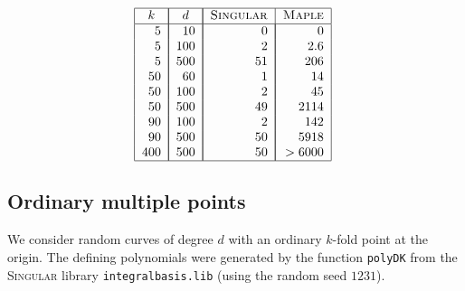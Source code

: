 \documentclass[a4paper,11pt]{amsart}%
\theoremstyle{definition}
\theoremstyle{plain}
\theoremstyle{remark}
\begin{document}
\[%
\begin{tabular}
[c]{|c|c|l|l|}\hline
$k$ & \multicolumn{1}{|c|}{$d$} & \multicolumn{1}{|l|}{\textsc{Singular}} &
\textsc{Maple}\\\hline
\multicolumn{1}{|r|}{$5$} & \multicolumn{1}{|r|}{$10$} &
\multicolumn{1}{|r|}{$0$} & \multicolumn{1}{|r|}{$0$}\\
\multicolumn{1}{|r|}{$5$} & \multicolumn{1}{|r|}{$100$} &
\multicolumn{1}{|r|}{$2$} & \multicolumn{1}{|r|}{$2.6$}\\
\multicolumn{1}{|r|}{$5$} & \multicolumn{1}{|r|}{$500$} &
\multicolumn{1}{|r|}{$51$} & \multicolumn{1}{|r|}{$206$}\\
\multicolumn{1}{|r|}{$50$} & \multicolumn{1}{|r|}{$60$} &
\multicolumn{1}{|r|}{$1$} & \multicolumn{1}{|r|}{$14$}\\
\multicolumn{1}{|r|}{$50$} & \multicolumn{1}{|r|}{$100$} &
\multicolumn{1}{|r|}{$2$} & \multicolumn{1}{|r|}{$45$}\\
\multicolumn{1}{|r|}{$50$} & \multicolumn{1}{|r|}{$500$} &
\multicolumn{1}{|r|}{$49$} & \multicolumn{1}{|r|}{$2114$}\\
\multicolumn{1}{|r|}{$90$} & \multicolumn{1}{|r|}{$100$} &
\multicolumn{1}{|r|}{$2$} & \multicolumn{1}{|r|}{$142$}\\
\multicolumn{1}{|r|}{$90$} & \multicolumn{1}{|r|}{$500$} &
\multicolumn{1}{|r|}{$50$} & \multicolumn{1}{|r|}{$5918$}\\
\multicolumn{1}{|r|}{$400$} & \multicolumn{1}{|r|}{$500$} &
\multicolumn{1}{|r|}{$50$} & \multicolumn{1}{|r|}{$>6000$}\\\hline
\end{tabular}
\
\]


\subsection{Ordinary multiple points}

We consider random curves of degree $d$ with an ordinary $k$-fold point at the
origin. The defining polynomials were generated by the function
\texttt{polyDK} from the \textsc{Singular}{} library
\texttt{integralbasis.lib} (using the random seed $1231$).

%
\end{document}
